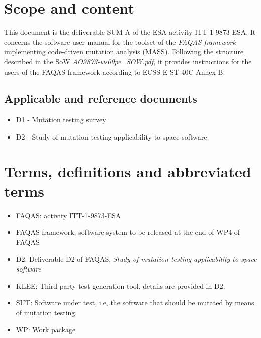 
\chapter{Scope and content}

This document is the deliverable SUM-A of the ESA activity ITT-1-9873-ESA. It concerns the software user manual for the toolset of the \emph{FAQAS framework} implementing code-driven mutation analysis (MASS).
 Following the structure described in the SoW \emph{AO9873-ws00pe\_SOW.pdf}, it provides instructions for the users of the FAQAS framework according to ECSS-E-ST-40C Annex B.
 
 
 
\section{Applicable and reference documents}

\begin{itemize}
\item{D1 - Mutation testing survey}
\item{D2 - Study of mutation testing applicability to space software}
\end{itemize}

\chapter{Terms, definitions and abbreviated terms}

\begin{itemize}
\item{FAQAS}: activity ITT-1-9873-ESA
\item{FAQAS-framework}: software system to be released at the end of WP4 of FAQAS
\item{D2}: Deliverable D2 of FAQAS, \emph{Study of mutation testing applicability to space software}
\item{KLEE}: Third party test generation tool, details are provided in D2.
\item{SUT}: Software under test, i.e, the software that should be mutated by means of mutation testing.
\item{WP}: Work package
\end{itemize}

\clearpage
 

